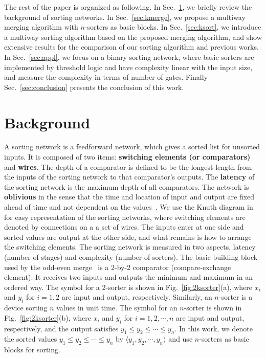 \documentclass[10pt,journal,cspaper,compsoc]{IEEEtran}
\begin{document}
The rest of the paper is organized as following. In Sec.~\ref{sec:bg}, we briefly review the background of sorting networks. In Sec.~\ref{sec:kmerge}, we propose a multiway merging algorithm with $n$-sorters as basic blocks. In Sec.~\ref{sec:ksort}, we introduce a multiway sorting algorithm based on the proposed merging algorithm, and show extensive results for the comparison of our sorting algorithm and previous works. In Sec.~\ref{sec:appl}, we focus on a binary sorting network, where basic sorters are implemented by threshold logic and have complexity linear with the input size, and measure the complexity in terms of number of gates. Finally Sec.~\ref{sec:conclusion} presents the conclusion of this work.



\section{Background}
\label{sec:bg}
A sorting network is a feedforward network, which gives a sorted list for unsorted inputs. It is composed of two items: \textbf{switching elements (or comparators)} and \textbf{wires}. The depth of a comparator is defined to be the longest length from the inputs of the sorting network to that comparator's outputs. The \textbf{latency} of the sorting network is the maximum depth of all comparators.
The network is \textbf{oblivious} in the sense that the time and location of input and output are fixed ahead of time and not dependent on the values~\cite{Bat68sorting}.
We use the Knuth diagram in \cite{knuth1973art} for easy representation of the sorting networks, where switching elements are denoted by connections on a a set of wires. The inputs enter at one side and sorted values are output at the other side, and what remains is how to arrange the switching elements. The sorting network is measured in two aspects, latency (number of stages) and complexity (number of sorters).
The basic building block used by the odd-even merge~\cite{Bat68sorting} is a 2-by-2 comparator (compare-exchange element). It receives two inputs and outputs the minimum and maximum in an ordered way.
The symbol for a 2-sorter is shown in Fig.~\ref{fig:2ksorter}(a), where $x_i$ and $y_i$ for $i=1,2$ are input and output, respectively.
Similarly, an $n$-sorter is a device sorting $n$ values in unit time. The symbol for an $n$-sorter is shown in Fig.~\ref{fig:2ksorter}(b), where $x_i$ and $y_i$ for $i=1,2,\cdots,n$ are input and output, respectively, and the output satisfies $y_1\le y_2 \le \cdots \le y_n$.
In this work, we denote the sorted values $y_1 \le y_2 \le \cdots \le y_n$ by $\langle y_1, y_2,\cdots, y_n \rangle$ and use $n$-sorters as basic blocks for sorting.
\end{document}
